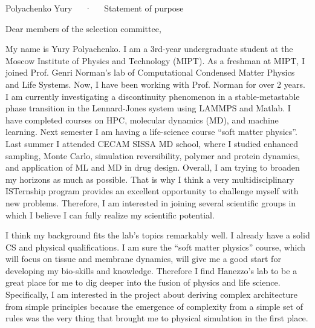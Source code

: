\documentclass[12pt, a4paper]{awesome-cv}
\begin{document}
\makecvheader[C]

\makecvfooter
  {\thepage}
  {Polyachenko Yury~~~·~~~Statement of purpose}
  {\thepage}

\vspace{25pt}
\hspace{5pt} Dear members of the selection committee, 

\begin{cvletter}


My name is Yury Polyachenko. I am a 3rd-year undergraduate student at the Moscow Institute of Physics and Technology (MIPT). As a freshman at MIPT, I joined Prof. Genri Norman’s lab of Computational Condensed Matter Physics and Life Systems. Now, I have been working with Prof. Norman for over 2 years. I am currently investigating a discontinuity phenomenon in a stable-metastable phase transition in the Lennard-Jones system using LAMMPS and Matlab. I have completed courses on HPC, molecular dynamics (MD), and machine learning. Next semester I am having a life-science course “soft matter physics”. Last summer I attended CECAM SISSA MD school, where I studied enhanced sampling, Monte Carlo, simulation reversibility, polymer and protein dynamics, and application of ML and MD in drug design. Overall, I am trying to broaden my horizons as much as possible. That is why I think a very multidisciplinary ISTernship program provides an excellent opportunity to challenge myself with new problems. Therefore, I am interested in joining several scientific groups in which I believe I can fully realize my scientific potential. 

I think my background fits the lab’s topics remarkably well. I already have a solid CS and physical qualifications. I am sure the “soft matter physics” course, which will focus on tissue and membrane dynamics, will give me a good start for developing my bio-skills and knowledge. Therefore I find Hanezzo’s lab to be a great place for me to dig deeper into the fusion of physics and life science. Specifically, I am interested in the project about deriving complex architecture from simple principles because the emergence of complexity from a simple set of rules was the very thing that brought me to physical simulation in the first place.


\end{cvletter}
\end{document}
